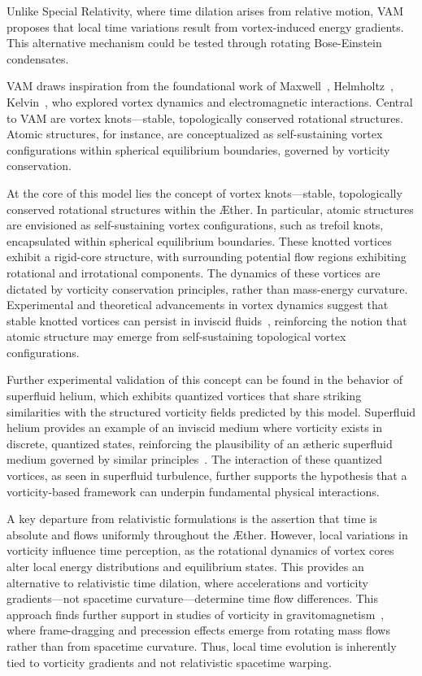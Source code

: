 \documentclass[a4paper,10pt]{article}
\begin{document}
Unlike Special Relativity, where time dilation arises from relative motion, VAM proposes that local time variations result from vortex-induced energy gradients. This alternative mechanism could be tested through rotating Bose-Einstein condensates.

VAM draws inspiration from the foundational work of Maxwell~\cite{maxwell1861}, Helmholtz~\cite{helmholtz1858}, Kelvin~\cite{kelvin1867}, who explored vortex dynamics and electromagnetic interactions. Central to VAM are vortex knots—stable, topologically conserved rotational structures. Atomic structures, for instance, are conceptualized as self-sustaining vortex configurations within spherical equilibrium boundaries, governed by vorticity conservation.

At the core of this model lies the concept of vortex knots—stable, topologically conserved rotational structures within the Æther. In particular, atomic structures are envisioned as self-sustaining vortex configurations, such as trefoil knots, encapsulated within spherical equilibrium boundaries. These knotted vortices exhibit a rigid-core structure, with surrounding potential flow regions exhibiting rotational and irrotational components. The dynamics of these vortices are dictated by vorticity conservation principles, rather than mass-energy curvature. Experimental and theoretical advancements in vortex dynamics suggest that stable knotted vortices can persist in inviscid fluids~\cite{kleckner2013}, reinforcing the notion that atomic structure may emerge from self-sustaining topological vortex configurations.

Further experimental validation of this concept can be found in the behavior of superfluid helium, which exhibits quantized vortices that share striking similarities with the structured vorticity fields predicted by this model. Superfluid helium provides an example of an inviscid medium where vorticity exists in discrete, quantized states, reinforcing the plausibility of an ætheric superfluid medium governed by similar principles~\cite{vinen2002}. The interaction of these quantized vortices, as seen in superfluid turbulence, further supports the hypothesis that a vorticity-based framework can underpin fundamental physical interactions.

A key departure from relativistic formulations is the assertion that time is absolute and flows uniformly throughout the Æther. However, local variations in vorticity influence time perception, as the rotational dynamics of vortex cores alter local energy distributions and equilibrium states. This provides an alternative to relativistic time dilation, where accelerations and vorticity gradients—not spacetime curvature—determine time flow differences. This approach finds further support in studies of vorticity in gravitomagnetism~\cite{cahill2005}, where frame-dragging and precession effects emerge from rotating mass flows rather than from spacetime curvature. Thus, local time evolution is inherently tied to vorticity gradients and not relativistic spacetime warping.
\end{document}
